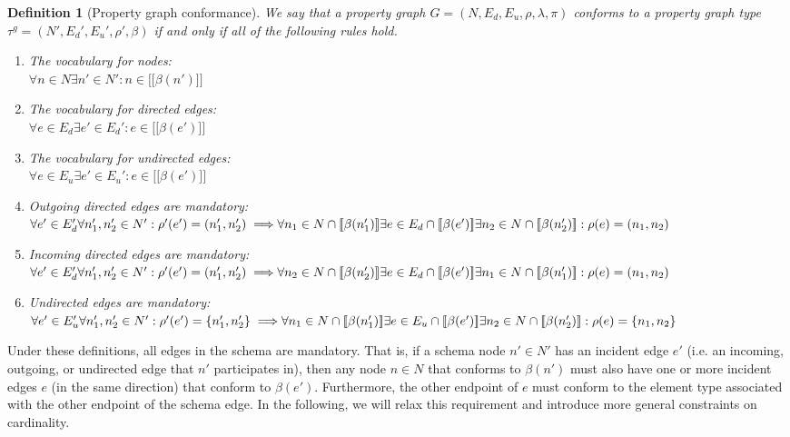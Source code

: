 \documentclass[a4paper]{article}
\newtheorem{definition}[theorem]{Definition}
\newcommand{\gtype}{\tau^g}
\newcommand{\lsem}{\ensuremath{[\![}}
\newcommand{\rsem}{\ensuremath{]\!]}}
\newcommand{\sem}[1]{\ensuremath{\lsem #1 \rsem}}
\begin{document}
\begin{definition}[Property graph conformance]
  We say that a property graph $G = (N, E_d, E_u, \rho, \lambda, \pi)$ \emph{conforms} to a property graph type $\gtype = (N', E_d', E_u', \rho', \beta)$ if and only if all of the following rules hold.

  \begin{enumerate}
    \item The vocabulary for nodes:\\
    $\forall n \in N \exists n' \in N' : n \in \sem{\beta(n')}$
    
    \item The vocabulary for directed edges:\\
    $\forall e \in E_d \exists e' \in E_d' : e \in \sem{\beta(e')}$

    \item The vocabulary for undirected edges:\\
    $\forall e \in E_u \exists e' \in E_u' : e \in \sem{\beta(e')}$
    
    \item Outgoing directed edges are mandatory:\\
    $\forall e' \in E_d' \forall n'_1, n'_2 \in N' : \rho'(e') = (n'_1, n'_2) \implies
    \\\forall n_1 \in N \cap \sem{\beta(n'_1)} \exists e \in E_d \cap \sem{\beta(e')} \exists n_2 \in N \cap \sem{\beta(n'_2)} : \rho(e) = (n_1, n_2)$

    \item Incoming directed edges are mandatory:\\
    $\forall e' \in E_d' \forall n'_1, n'_2 \in N' : \rho'(e') = (n'_1, n'_2) \implies
    \\\forall n_2 \in N \cap \sem{\beta(n'_2)} \exists e \in E_d \cap \sem{\beta(e')} \exists n_1 \in N \cap \sem{\beta(n'_1)} : \rho(e) = (n_1, n_2)$
    
    \item Undirected edges are mandatory:\\
    $\forall e' \in E_u' \forall n'_1, n'_2 \in N' : \rho'(e') = \{n'_1, n'_2\} \implies
    \\\forall n_1 \in N \cap \sem{\beta(n'_1)} \exists e \in E_u \cap \sem{\beta(e')} \exists n_2 \in N \cap \sem{\beta(n'_2)} : \rho(e) = \{n_1, n_2\}$
  \end{enumerate}
\end{definition}

Under these definitions, all edges in the schema are mandatory. That is, if a schema node $n' \in N'$ has an incident edge $e'$ (i.e. an incoming, outgoing, or undirected edge that $n'$ participates in), then any node $n \in N$ that conforms to $\beta(n')$ must also have one or more incident edges $e$ (in the same direction) that conform to $\beta(e')$. Furthermore, the other endpoint of $e$ must conform to the element type associated with the other endpoint of the schema edge. In the following, we will relax this requirement and introduce more general constraints on cardinality.
\end{document}
